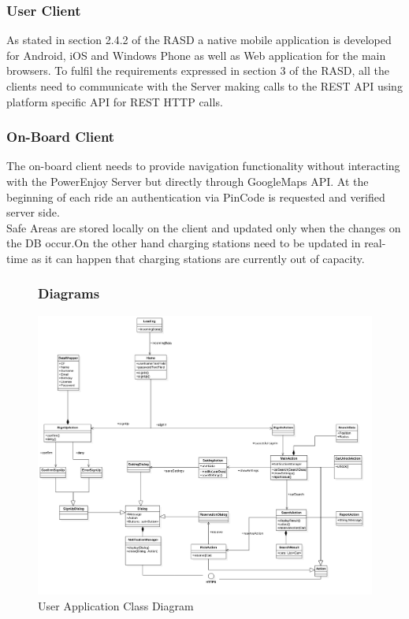 \subsubsection{User Client}

As stated in section 2.4.2 of the RASD a native mobile application is developed
for Android, iOS and Windows Phone as well as Web application for the main browsers.
To fulfil the requirements expressed in section 3 of the
RASD, all the clients need to communicate with the Server making calls to
the REST API using platform specific API for REST HTTP calls.

\subsubsection{On-Board Client}
The on-board client needs to provide navigation functionality without interacting with the PowerEnjoy Server but directly through GoogleMaps API. At the beginning of each ride an authentication via PinCode is requested and verified server side.\\Safe Areas are stored locally on the client and updated only when the changes on the DB occur.On the other hand charging stations need to be updated in real-time as it can happen that charging stations are currently out of capacity.
\clearpage


\FloatBarrier
\begin{figure}
\subsubsection{Diagrams}
\includegraphics[scale=0.35]{Images/ClassDiagram/User.png}
\caption{User Application Class Diagram}
\end{figure}
\FloatBarrier

